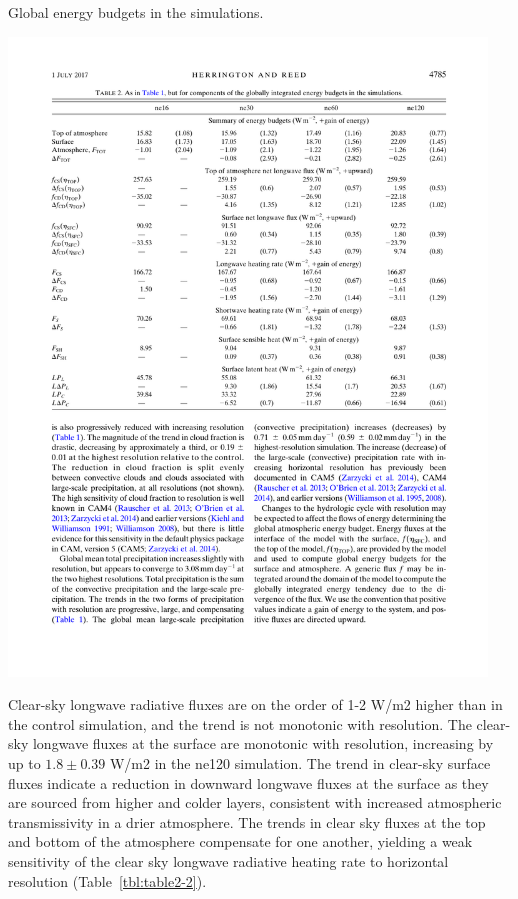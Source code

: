 \begin{table}[t]
\caption{Global energy budgets in the simulations.}
\begin{center}
\noindent\includegraphics[width=30pc,angle=0]{chapter2/table2.pdf}\\
\end{center}
\label{tbl:table2-2}
\end{table}

Clear-sky longwave radiative fluxes are on the order of 1-2 W/m2 higher than in the control simulation, and the trend is not monotonic with resolution. The clear-sky longwave fluxes at the surface are monotonic with resolution, increasing by up to $1.8 \pm 0.39$ W/m2 in the ne120 simulation. The trend in clear-sky surface fluxes indicate a reduction in downward longwave fluxes at the surface as they are sourced from higher and colder layers, consistent with increased atmospheric transmissivity in a drier atmosphere. The trends in clear sky fluxes at the top and bottom of the atmosphere compensate for one another, yielding a weak sensitivity of the clear sky longwave radiative heating rate to horizontal resolution (Table~\ref{tbl:table2-2}).


